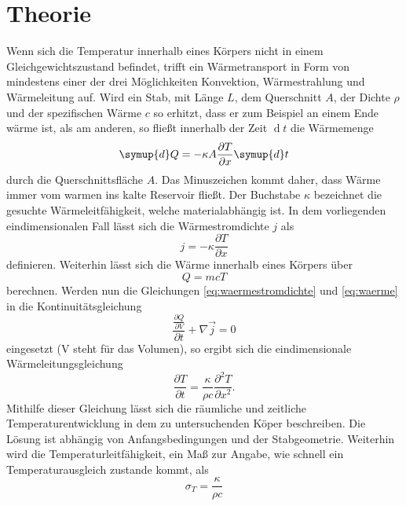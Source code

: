 \section{Theorie}
\label{sec:Theorie}

Wenn sich die Temperatur innerhalb eines Körpers nicht in einem Gleichgewichtszustand
befindet, trifft ein Wärmetransport in Form von mindestens einer der drei Möglichkeiten 
Konvektion, Wärmestrahlung und Wärmeleitung auf.
Wird ein Stab, mit Länge $L$, dem Querschnitt $A$, der Dichte $\rho$ und der spezifischen 
Wärme $c$ so erhitzt, dass er zum Beispiel an einem Ende wärme ist, als am anderen, so 
fließt innerhalb der Zeit $\operatorname{d}t$ die Wärmemenge 
\begin{equation}
    \symup{d}Q = -\kappa A \frac{\partial T}{\partial x} \symup{d}t
\end{equation}
\noindent durch die Querschnittsfläche $A$. Das Minuszeichen kommt daher, dass Wärme immer
vom warmen ins kalte Reservoir fließt. Der Buchstabe $\kappa$ bezeichnet die
gesuchte Wärmeleitfähigkeit, welche materialabhängig ist. In dem vorliegenden eindimensionalen 
Fall lässt sich die Wärmestromdichte $j$ als
\begin{equation}
    j = - \kappa \frac{\partial T}{\partial x}
    \label{eq:waermestromdichte}
\end{equation}
\noindent definieren. Weiterhin lässt sich die Wärme innerhalb eines Körpers über \cite{sample2}
\begin{equation}
    Q = m c T 
    \label{eq:waerme}
\end{equation}
\noindent berechnen. Werden nun die Gleichungen \ref{eq:waermestromdichte} und \ref{eq:waerme}
in die Kontinuitätsgleichung 
\begin{equation}
    \frac{\frac{\partial Q}{\partial V}}{\partial t} + \nabla \vec{j} = 0
\end{equation}
\noindent eingesetzt (V steht für das Volumen), so ergibt sich die eindimensionale 
Wärmeleitungsgleichung
\begin{equation}
    \frac{\partial T}{\partial t} = \frac{\kappa}{\rho c} \frac{\partial^2 T}{\partial x^2}.
\end{equation}
\noindent Mithilfe dieser Gleichung lässt sich die räumliche und zeitliche Temperaturentwicklung 
in dem zu untersuchenden Köper beschreiben. Die Lösung ist abhängig von Anfangsbedingungen 
und der Stabgeometrie. Weiterhin wird die Temperaturleitfähigkeit, ein Maß
zur Angabe, wie schnell ein Temperaturausgleich zustande kommt, als
\begin{equation}
    \sigma_{T} = \frac{\kappa}{\rho c}
\end{equation}
